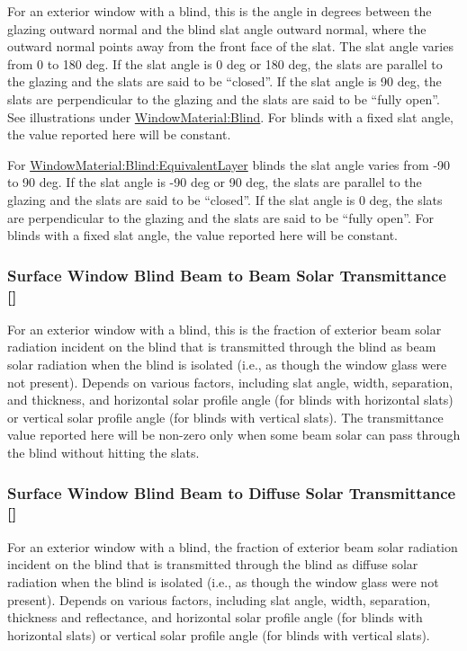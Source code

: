 For an exterior window with a blind, this is the angle in degrees between the glazing outward normal and the blind slat angle outward normal, where the outward normal points away from the front face of the slat. The slat angle varies from 0 to 180 deg. If the slat angle is 0 deg or 180 deg, the slats are parallel to the glazing and the slats are said to be ``closed''. If the slat angle is 90 deg, the slats are perpendicular to the glazing and the slats are said to be ``fully open''. See illustrations under \hyperref[windowmaterialblind]{WindowMaterial:Blind}. For blinds with a fixed slat angle, the value reported here will be constant.

For \hyperref[windowmaterialblindequivalentlayer]{WindowMaterial:Blind:EquivalentLayer} blinds the slat angle varies from -90 to 90 deg. If the slat angle is -90 deg or 90 deg, the slats are parallel to the glazing and the slats are said to be ``closed''. If the slat angle is 0 deg, the slats are perpendicular to the glazing and the slats are said to be ``fully open''. For blinds with a fixed slat angle, the value reported here will be constant.


\subsubsection{Surface Window Blind Beam to Beam Solar Transmittance {[]}}\label{surface-window-blind-beam-to-beam-solar-transmittance}

For an exterior window with a blind, this is the fraction of exterior beam solar radiation incident on the blind that is transmitted through the blind as beam solar radiation when the blind is isolated (i.e., as though the window glass were not present). Depends on various factors, including slat angle, width, separation, and thickness, and horizontal solar profile angle (for blinds with horizontal slats) or vertical solar profile angle (for blinds with vertical slats). The transmittance value reported here will be non-zero only when some beam solar can pass through the blind without hitting the slats.

\subsubsection{Surface Window Blind Beam to Diffuse Solar Transmittance {[]}}\label{surface-window-blind-beam-to-diffuse-solar-transmittance}

For an exterior window with a blind, the fraction of exterior beam solar radiation incident on the blind that is transmitted through the blind as diffuse solar radiation when the blind is isolated (i.e., as though the window glass were not present). Depends on various factors, including slat angle, width, separation, thickness and reflectance, and horizontal solar profile angle (for blinds with horizontal slats) or vertical solar profile angle (for blinds with vertical slats).

